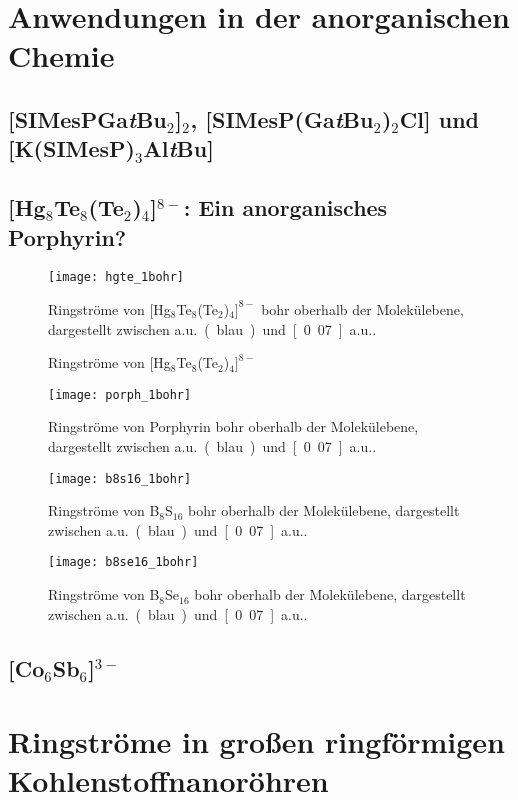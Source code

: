 \section{Anwendungen in der anorganischen Chemie}
\subsection{[SIMesPGa\textit{t}Bu$_2$]$_2$, [SIMesP(Ga\textit{t}Bu$_2$)$_2$Cl] und [K(SIMesP)$_3$Al\textit{t}Bu]}
\subsection{[Hg$_8$Te$_8$(Te$_2$)$_4$]$^{8-}$: Ein anorganisches Porphyrin?}
\begin{figure}[ht!]
	\centering
	\texttt{[image: hgte\_1bohr]}
	\captionsetup{figurewithin = chapter}
	\captionsetup{font=small, labelfont=bf}\caption{Ringströme von $[$Hg$_8$Te$_8$(Te$_2$)$_4]^{8-}$}{Ringströme von $[$Hg$_8$Te$_8$(Te$_2$)$_4]^{8-}$ \unit[1]{bohr} oberhalb der Molekülebene, dargestellt zwischen \unit[0]{a.u.} (blau) und \unit[0.07]{a.u.}.}
\label{abb:hgtelic}
\end{figure}

\begin{figure}[ht!]
	\centering
	\texttt{[image: porph\_1bohr]}
	\captionsetup{figurewithin = chapter}
	\captionsetup{font=small, labelfont=bf}\caption[Ringströme von Porphyrin]{Ringströme von Porphyrin \unit[1]{bohr} oberhalb der Molekülebene, dargestellt zwischen \unit[0]{a.u.} (blau) und \unit[0.07]{a.u.}.}
\label{abb:porphlic}
\end{figure}

\begin{figure}[ht!]
	\centering
	\texttt{[image: b8s16\_1bohr]}
	\captionsetup{figurewithin = chapter}
	\captionsetup{font=small, labelfont=bf}\caption[Ringströme von B$_8$S$_{16}$]{Ringströme von B$_8$S$_{16}$ \unit[1]{bohr} oberhalb der Molekülebene, dargestellt zwischen \unit[0]{a.u.} (blau) und \unit[0.07]{a.u.}.}
\label{abb:b8s16hlic}
\end{figure}

\begin{figure}[ht!]
	\centering
	\texttt{[image: b8se16\_1bohr]}
	\captionsetup{figurewithin = chapter}
	\captionsetup{font=small, labelfont=bf}\caption[Ringströme von B$_8$Se$_{16}$]{Ringströme von B$_8$Se$_{16}$ \unit[1]{bohr} oberhalb der Molekülebene, dargestellt zwischen \unit[0]{a.u.} (blau) und \unit[0.07]{a.u.}.}
\label{abb:b8se16hlic}
\end{figure}
\subsection{[Co\@Sn$_6$Sb$_6$]$^{3-}$}
\section{Ringströme in großen ringförmigen Kohlenstoffnanoröhren}